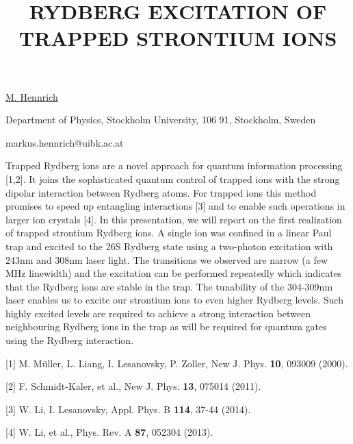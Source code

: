 \title{RYDBERG EXCITATION OF TRAPPED STRONTIUM IONS}

\underline{M. Hennrich} 

{\normalsize{\vspace{-4mm}
Department of Physics,
Stockholm University,
106 91, Stockholm,
Sweden

\email markus.hennrich@uibk.ac.at}}

Trapped Rydberg ions are a novel approach for quantum information processing [1,2]. It joins the sophisticated quantum control of trapped ions with the strong dipolar interaction between Rydberg atoms. For trapped ions this method promises to speed up entangling interactions [3] and to enable such operations in larger ion crystals [4].
In this presentation, we will report on the first realization of trapped strontium Rydberg ions. A single ion was confined in a linear Paul trap and excited to the 26S Rydberg state using a two-photon excitation with 243nm and 308nm laser light. The transitions we observed are narrow (a few MHz linewidth) and the excitation can be performed repeatedly which indicates that the Rydberg ions are stable in the trap. The tunability of the 304-309nm laser enables us to excite our strontium ions to even higher Rydberg levels. Such highly excited levels are required to achieve a strong interaction between neighbouring Rydberg ions in the trap as will be required for quantum gates using the Rydberg interaction.

{\normalsize
[1] M. M\"{u}ller, L. Liang, I. Lesanovsky, P. Zoller, New J. Phys. \textbf{10}, 093009 (2000).
\vsp

[2] F. Schmidt-Kaler, et al., New J. Phys. \textbf{13}, 075014 (2011).
\vsp

[3] W. Li, I. Lesanovsky, Appl. Phys. B \textbf{114}, 37-44 (2014).
\vsp

[4] W. Li, et al., Phys. Rev. A \textbf{87}, 052304 (2013).
}

\vspace{\baselineskip}
